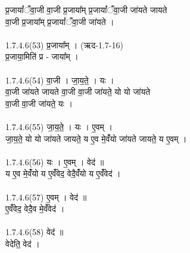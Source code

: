 प्र॒जायां᳚ँवा॒जी वा॒जी प्र॒जाया᳚म् प्र॒जायां᳚ँवा॒जी जा॑यते जायते\\
वा॒जी प्र॒जाया᳚म् प्र॒जायां᳚ँवा॒जी जा॑यते ।\\
\\
1.7.4.6(53)  प्र॒जाया᳚म् । (ऋद-1.7-16)\\
प्र॒जाया॒मिति॑ प्र - जाया᳚म् ।\\
\\
1.7.4.6(54)  वा॒जी । जा॒य॒ते॒ । यः ।\\
वा॒जी जा॑यते जायते वा॒जी वा॒जी जा॑यते॒ यो यो जा॑यते\\
वा॒जी वा॒जी जा॑यते॒ यः ।\\
\\
1.7.4.6(55)  जा॒य॒ते॒ । यः । ए॒वम् ।\\
जा॒य॒ते॒ यो यो जा॑यते जायते॒ य ए॒व मे॒वंँयो जा॑यते जायते॒ य ए॒वम् ।\\
\\
1.7.4.6(56)  यः । ए॒वम् । वेद॑ ॥\\
य ए॒व मे॒वंँयो य ए॒वंँवेद॒ वेदै॒वंँयो य ए॒वंँवेद॑ ।\\
\\
1.7.4.6(57)  ए॒वम् । वेद॑ ॥\\
ए॒वंँवेद॒ वेदै॒व मे॒वंँवेद॑ ।\\
\\
1.7.4.6(58)  वेद॑ ॥\\
वेदेति॒ वेद॑ ।\\\